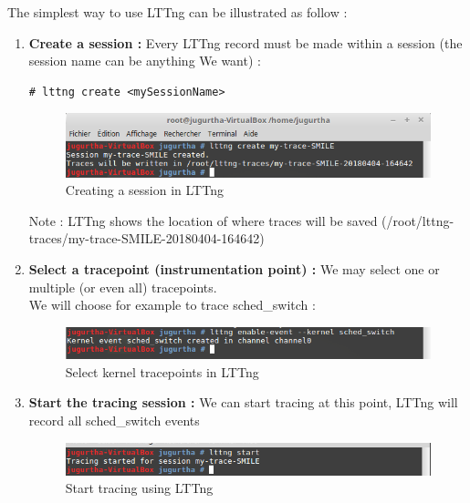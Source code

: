 The simplest way to use LTTng can be illustrated as follow :
\begin{enumerate}
	\item \textbf{Create a session :} Every LTTng record must be made within a session (the session name can be anything We want) :
		\begin{lstlisting}[style=BashInputStyle]
# lttng create <mySessionName>
	\end{lstlisting}	

		\begin{figure}[H]
			\centering
        	\includegraphics[scale=0.42]{img/solution/create-session-lttng.png}
        	\caption{Creating a session in LTTng}
        	\label{Creating a session in LTTng}
    	\end{figure}	
Note : LTTng shows the location of where traces will be saved (/root/lttng-traces/my-trace-SMILE-20180404-164642)	
	
	\item \textbf{Select a tracepoint (instrumentation point) : } We may select one or multiple (or even all) tracepoints.\\
We will choose for example to trace \og sched\_switch \fg :

		\begin{figure}[H]
			\centering
        	\includegraphics[scale=0.45]{img/solution/lttng-select-event.png}
        	\caption{Select kernel tracepoints in LTTng}
        	\label{Select kernel tracepoints in LTTng}
    	\end{figure}



	\item \textbf{Start the tracing session :} We can start tracing at this point, LTTng will record all \og sched\_switch \fg events
		\begin{figure}[H]
			\centering
        	\includegraphics[scale=0.45]{img/solution/lttng-start-tracing.png}
        	\caption{Start tracing using LTTng}
        	\label{Start tracing using LTTng}
    	\end{figure}



\end{enumerate}
